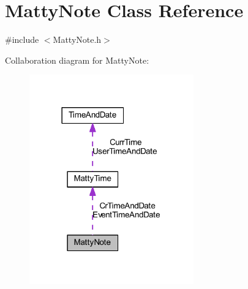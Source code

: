 \hypertarget{classMattyNote}{}\section{Matty\+Note Class Reference}
\label{classMattyNote}


{\ttfamily \#include $<$Matty\+Note.\+h$>$}



Collaboration diagram for Matty\+Note\+:
\nopagebreak
\begin{figure}[H]
\begin{center}
\leavevmode
\includegraphics[width=201pt]{classMattyNote__coll__graph}
\end{center}
\end{figure}
